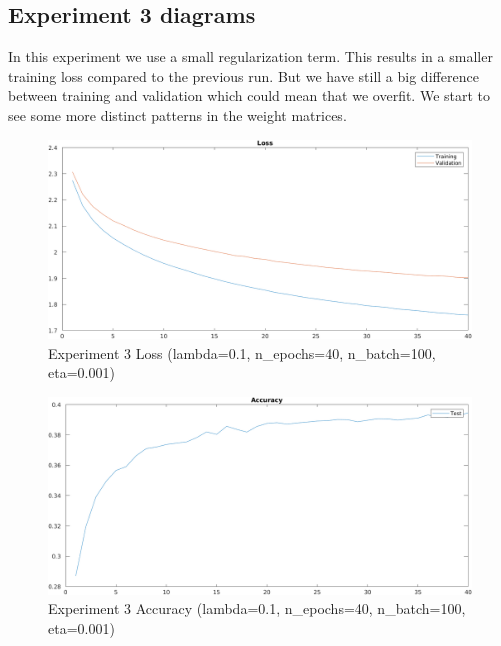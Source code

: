\clearpage
\subsection{Experiment 3 diagrams}
In this experiment we use a small regularization term. This results in a smaller training loss compared to the previous run.
But we have still a big difference between training and validation which could mean that we overfit. We start to see some more distinct patterns
in the weight matrices.

    \begin{figure}[ht]
        \includegraphics[width=\textwidth]{../code/result_pics/lambda=.1, n_epochs=40, n_batch=100, eta=.001/loss.png}
        \caption{Experiment 3 Loss (lambda=0.1, n\_epochs=40, n\_batch=100, eta=0.001)}
        \label{fig:loss3}
    \end{figure}

    \begin{figure}[ht]
        \includegraphics[width=\textwidth]{../code/result_pics/lambda=.1, n_epochs=40, n_batch=100, eta=.001/accuracy.png}
        \caption{Experiment 3 Accuracy (lambda=0.1, n\_epochs=40, n\_batch=100, eta=0.001)}
        \label{fig:accuracy3}
    \end{figure}

